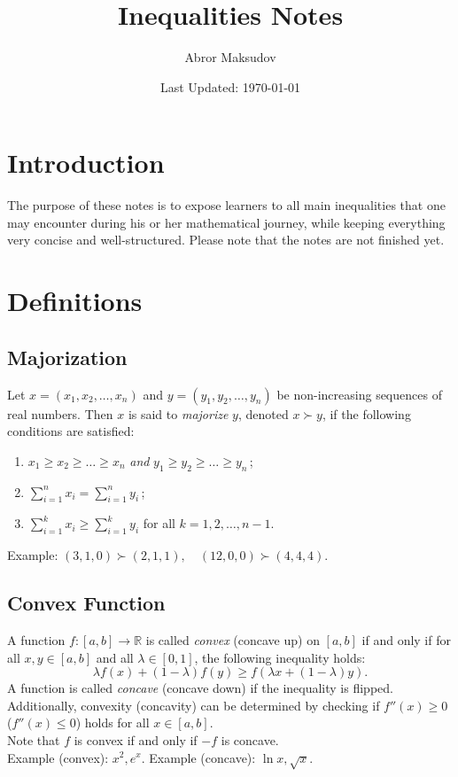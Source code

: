 \documentclass[a4paper,11pt]{article}
\title{Inequalities Notes}
\author{Abror Maksudov}
\date{Last Updated: \today}
\begin{document}
\maketitle
\tableofcontents

\section{Introduction}
The purpose of these notes is to expose learners to all main inequalities that one may encounter during his or her mathematical journey, while keeping everything very concise and well-structured. Please note that the notes are not finished yet.


\section{Definitions}


\subsection{Majorization}
\begin{tcolorbox}[breakable]
    Let $x = (x_1, x_2, \dots, x_n)$ and $y = (y_1, y_2, \dots, y_n)$ be non-increasing sequences of real numbers. Then $x$ is said to \emph{majorize} $y$, denoted $x \succ y$, if the following conditions are satisfied:
    \begin{enumerate}
        \item $x_1 \geq x_2 \geq \dots \geq x_n$ \emph{and} $y_1 \geq y_2 \geq \dots \geq y_n$\,;
        \item $\sum_{i=1}^n x_i = \sum_{i=1}^n y_i$\,;
        \item $\sum_{i=1}^k x_i \geq \sum_{i=1}^k y_i$ for all $k = 1, 2, \dots, n-1$.
    \end{enumerate}
    Example: $(3,1,0) \succ (2,1,1), \quad (12, 0,0) \succ (4,4,4)$.
\end{tcolorbox}


\subsection{Convex Function}
\begin{tcolorbox}[breakable]
    A function $f : [a,b] \to \mathbb{R}$ is called \textit{convex} (concave up) on $[a,b]$ if and only if for all $x,y \in [a,b]$ and all $\lambda \in [0,1]$, the following inequality holds:
    \[
    \lambda f(x) + (1-\lambda)f(y) \geq f(\lambda x + (1-\lambda)y).
    \]
    A function is called \textit{concave} (concave down) if the inequality is flipped. \\[6pt]
    Additionally, convexity (concavity) can be determined by checking if $f''(x) \geq 0$ \newline ($f''(x) \leq 0$) holds for all $x \in [a,b]$. \\[6pt]
    Note that $f$ is convex if and only if $-f$ is concave. \\[6pt]
    Example (convex): $x^2, e^x$. Example (concave): $\ln{x}, \sqrt{x}$.
\end{tcolorbox}
\end{document}
